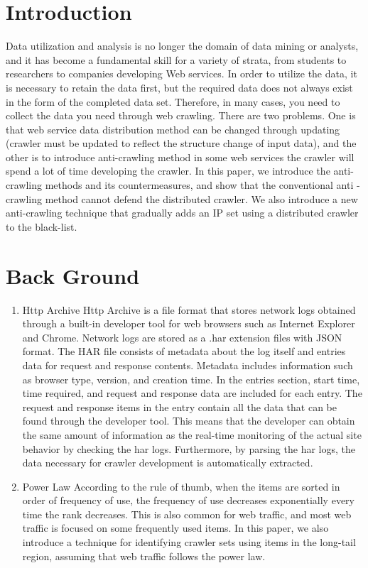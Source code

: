 %
%
\section{Introduction}
Data utilization and analysis is no longer the domain of data mining or analysts, and it has become a fundamental skill for a variety of strata, from students to researchers to companies developing Web services. 
In order to utilize the data, it is necessary to retain the data first, but the required data does not always exist in the form of the completed data set. Therefore, in many cases, you need to collect the data you need through web crawling.
There are two problems. One is that web service data distribution method can be changed through updating (crawler must be updated to reflect the structure change of input data), and the other is to introduce anti-crawling method in some web services the crawler will spend a lot of time developing the crawler.
In this paper, we introduce the anti-crawling methods and its countermeasures, and show that the conventional anti - crawling method cannot defend the distributed crawler. We also introduce a new anti-crawling technique that gradually adds an IP set using a distributed crawler to the black-list.



%
%
\section{Back Ground}
\begin{enumerate}
\item Http Archive
\newline Http Archive is a file format that stores network logs obtained through a built-in developer tool for web browsers such as Internet Explorer and Chrome. Network logs are stored as a .har extension files with JSON format. The HAR file consists of metadata about the log itself and entries data for request and response contents. Metadata includes information such as browser type, version, and creation time. In the entries section, start time, time required, and request and response data are included for each entry.
The request and response items in the entry contain all the data that can be found through the developer tool. This means that the developer can obtain the same amount of information as the real-time monitoring of the actual site behavior by checking the har logs. Furthermore, by parsing the har logs, the data necessary for crawler development is automatically extracted.
\newline
\item Power Law
\newline 
According to the rule of thumb, when the items are sorted in order of frequency of use, the frequency of use decreases exponentially every time the rank decreases. This is also common for web traffic, and most web traffic is focused on some frequently used items. In this paper, we also introduce a technique for identifying crawler sets using items in the long-tail region, assuming that web traffic follows the power law.
\end{enumerate}




